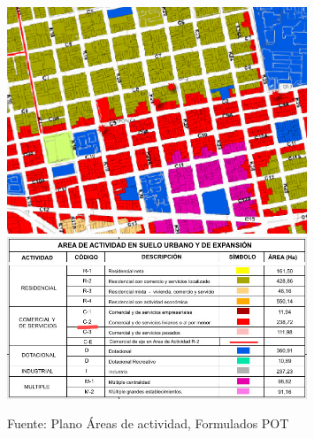 \documentclass[12pt,a4paper,twoside]{article}
\begin{document}
{\begin{figure}[!h]
	\centering
	\includegraphics[width=0.8\textwidth]{Norma/AreaAc}
	\includegraphics[width=0.8\textwidth]{Norma/AreaAcL}
	\caption{Fuente: Plano Áreas de actividad, Formulados POT}
	\label{fig:Usos}
\end{figure}

%
%

}
\end{document}
